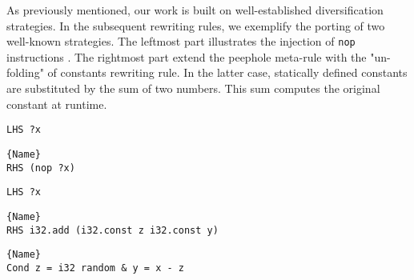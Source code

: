 As previously mentioned, our work is built on well-established diversification strategies. 
In the subsequent rewriting rules, we exemplify the porting of two well-known strategies. 
The leftmost part illustrates the injection of \texttt{nop} instructions \cite{10.1145/2086696.2086702}. 
The rightmost part extend the peephole meta-rule with the "un-folding" of constants rewriting rule. 
In the latter case, statically defined constants are substituted by the sum of two numbers. 
This sum computes the original constant at runtime.


\begin{minipage}{0.95\linewidth}
\begin{minipage}{0.49\linewidth}
    
    \lstset{
    language=ttt,
    style=watcode,
    basicstyle=\footnotesize\ttfamily,
    columns=fullflexible,
    breaklines=true}
    \begin{lstlisting}[]
LHS ?x
            \end{lstlisting}\vspace{-0.5cm}
    \noindent\hrulefill
        \lstset{
            language=ttt,
            style=watcode,
            basicstyle=\footnotesize\ttfamily,
            columns=fullflexible,
            breaklines=true}
            \vspace{-0.2cm}
            \begin{lstlisting}[numbers=none]{Name}
RHS (nop ?x)
    \end{lstlisting}
\end{minipage}
\begin{minipage}{0.49\linewidth}
    \lstset{
    language=ttt,
    style=watcode,
    basicstyle=\footnotesize\ttfamily,
    columns=fullflexible,
    breaklines=true}
    \begin{lstlisting}[]
LHS ?x
            \end{lstlisting}\vspace{-0.5cm}
    \noindent\hrulefill
        \lstset{
            language=ttt,
            style=watcode,
            basicstyle=\footnotesize\ttfamily,
            columns=fullflexible,
            breaklines=true}
            \vspace{-0.2cm}
            \begin{lstlisting}[numbers=none]{Name}
RHS i32.add (i32.const z i32.const y) 
    \end{lstlisting}\vspace{-0.5cm}
    \noindent\hrulefill
\lstset{
        language=ttt,
        style=watcode,
        basicstyle=\footnotesize\ttfamily,
        columns=fullflexible,
        breaklines=true}
        \begin{lstlisting}[numbers=none]{Name}
Cond z = i32 random & y = x - z 
        \end{lstlisting}
\end{minipage}    
\end{minipage}


